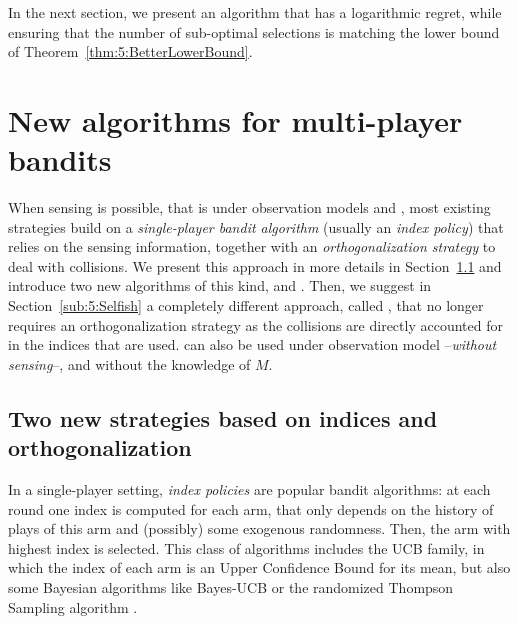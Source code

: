 In the next section, we present an algorithm that has a logarithmic regret,
while ensuring that the number of sub-optimal selections is matching the lower bound of Theorem~\ref{thm:5:BetterLowerBound}.



\section{New algorithms for multi-player bandits}
\label{sec:5:algorithms}

When sensing is possible, that is under observation models \modelun{} and \modeldeux, most existing strategies build on a \emph{single-player bandit algorithm} (usually an \emph{index policy}) that relies on the sensing information, together with an \emph{orthogonalization strategy} to deal with collisions. We present this approach in more details in Section~\ref{sub:5:RandTopM_and_MCTopM} and introduce two new algorithms of this kind, \RandTopM{} and \MCTopM.
%
Then, we suggest in Section~\ref{sub:5:Selfish} a completely different approach, called \Selfish{}, that no longer requires an orthogonalization strategy as the collisions are directly accounted for in the indices that are used.
\Selfish{} can also be used under observation model \modeltrois{} --\emph{without sensing}--, and without the knowledge of $M$.



\subsection{Two new strategies based on indices and orthogonalization}
\label{sub:5:RandTopM_and_MCTopM}


In a single-player setting, \emph{index policies} are popular bandit algorithms: at each round one index is computed for each arm, that only depends on the history of plays of this arm and (possibly) some exogenous randomness. Then, the arm with highest index is selected. This class of algorithms includes the UCB family, in which the index of each arm is an Upper Confidence Bound for its mean, but also some Bayesian algorithms like Bayes-UCB \citep{Kaufmann12BUCB} or the randomized Thompson Sampling algorithm \citep{Thompson33,AgrawalGoyal11,Kaufmann12Thompson}.

